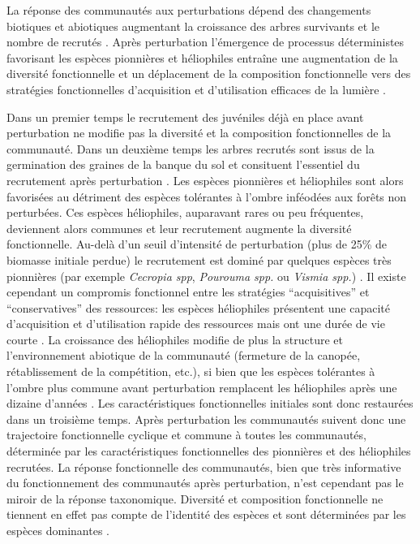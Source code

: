 \documentclass[
  11pt,
  french,
  A4paper,
  extrafontsizes,onecolumn,openright
  ]{memoir}
\begin{document}
La réponse des communautés aux perturbations dépend des changements
biotiques et abiotiques augmentant la croissance des arbres survivants
et le nombre de recrutés \autocite{Piponiot2016}. Après perturbation
l'émergence de processus déterministes favorisant les espèces pionnières
et héliophiles entraîne une augmentation de la diversité fonctionnelle
et un déplacement de la composition fonctionnelle vers des stratégies
fonctionnelles d'acquisition et d'utilisation efficaces de la lumière
\autocites{Violle2007b}{Baraloto2012a}.

Dans un premier temps le recrutement des juvéniles déjà en place avant
perturbation ne modifie pas la diversité et la composition
fonctionnelles de la communauté. Dans un deuxième temps les arbres
recrutés sont issus de la germination des graines de la banque du sol et
consituent l'essentiel du recrutement après perturbation
\autocite{Lawton1988}. Les espèces pionnières et héliophiles sont alors
favorisées au détriment des espèces tolérantes à l'ombre inféodées aux
forêts non perturbées. Ces espèces héliophiles, auparavant rares ou peu
fréquentes, deviennent alors communes et leur recrutement augmente la
diversité fonctionnelle. Au-delà d'un seuil d'intensité de perturbation
(plus de 25\% de biomasse initiale perdue) le recrutement est dominé par
quelques espèces très pionnières (par exemple \emph{Cecropia spp},
\emph{Pourouma spp.} ou \emph{Vismia spp.}) \autocite{Guitet2018}. Il
existe cependant un compromis fonctionnel entre les stratégies
``acquisitives'' et ``conservatives'' des ressources: les espèces
héliophiles présentent une capacité d'acquisition et d'utilisation
rapide des ressources mais ont une durée de vie courte
\autocite{Falster2011}. La croissance des héliophiles modifie de plus la
structure et l'environnement abiotique de la communauté (fermeture de la
canopée, rétablissement de la compétition, etc.), si bien que les
espèces tolérantes à l'ombre plus commune avant perturbation remplacent
les héliophiles après une dizaine d'années \autocite{Denslow2000}. Les
caractéristiques fonctionnelles initiales sont donc restaurées dans un
troisième temps. Après perturbation les communautés suivent donc une
trajectoire fonctionnelle cyclique et commune à toutes les communautés,
déterminée par les caractéristiques fonctionnelles des pionnières et des
héliophiles recrutées. La réponse fonctionnelle des communautés, bien
que très informative du fonctionnement des communautés après
perturbation, n'est cependant pas le miroir de la réponse taxonomique.
Diversité et composition fonctionnelle ne tiennent en effet pas compte
de l'identité des espèces et sont déterminées par les espèces dominantes
\autocites{Grime1998}{Lavorel2002}.
\end{document}
